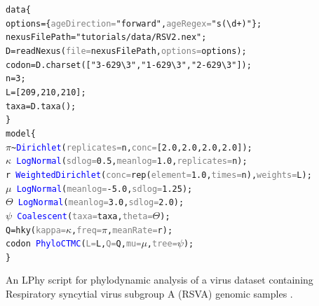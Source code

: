 \documentclass[10pt,letterpaper,table]{article}
\theoremstyle{definition}
\begin{document}
{
  \small
  \begin{example}
    \begin{alltt}
      data \{
      \quad options = \{\textcolor{gray}{ageDirection=}\textcolor{constant}{"forward"}, \textcolor{gray}{ageRegex=}\textcolor{constant}{"s(\textbackslash{}d+)"}\};
      \quad nexusFilePath = \textcolor{constant}{"tutorials/data/RSV2.nex"};
      \quad D = \textcolor{generator}{readNexus}(\textcolor{gray}{file=}nexusFilePath, \textcolor{gray}{options=}options);
      \quad codon = D.\textcolor{generator}{charset}([\textcolor{constant}{"3-629\textbackslash{}3"}, \textcolor{constant}{"1-629\textbackslash{}3"}, \textcolor{constant}{"2-629\textbackslash{}3"}]);
      \quad n = \textcolor{constant}{3};
      \quad L = [\textcolor{constant}{209}, \textcolor{constant}{210}, \textcolor{constant}{210}];
      \quad taxa = D.\textcolor{generator}{taxa}();
      \}
      model \{
      \quad \textcolor{bluishgreen}{\(\pi\)} \textasciitilde \textcolor{blue}{Dirichlet}(\textcolor{gray}{replicates=}n, \textcolor{gray}{conc=}[\textcolor{constant}{2.0}, \textcolor{constant}{2.0}, \textcolor{constant}{2.0}, \textcolor{constant}{2.0}]);
      \quad \textcolor{bluishgreen}{\(\kappa\)} ~ \textcolor{blue}{LogNormal}(\textcolor{gray}{sdlog=}\textcolor{constant}{0.5}, \textcolor{gray}{meanlog=}\textcolor{constant}{1.0}, \textcolor{gray}{replicates=}n);
      \quad \textcolor{bluishgreen}{r} ~ \textcolor{blue}{WeightedDirichlet}(\textcolor{gray}{conc=}\textcolor{generator}{rep}(\textcolor{gray}{element=}\textcolor{constant}{1.0}, \textcolor{gray}{times=}n), \textcolor{gray}{weights=}L);
      \quad \textcolor{bluishgreen}{\(\mu\)} ~ \textcolor{blue}{LogNormal}(\textcolor{gray}{meanlog=}\textcolor{constant}{-5.0}, \textcolor{gray}{sdlog=}\textcolor{constant}{1.25});
      \quad \textcolor{bluishgreen}{\(\Theta\)} ~ \textcolor{blue}{LogNormal}(\textcolor{gray}{meanlog=}\textcolor{constant}{3.0}, \textcolor{gray}{sdlog=}\textcolor{constant}{2.0});
      \quad \textcolor{bluishgreen}{\(\psi\)} ~ \textcolor{blue}{Coalescent}(\textcolor{gray}{taxa=}taxa, \textcolor{gray}{theta=}\textcolor{bluishgreen}{\(\Theta\)});
      \quad Q = \textcolor{generator}{hky}(\textcolor{gray}{kappa=}\textcolor{bluishgreen}{\(\kappa\)}, \textcolor{gray}{freq=}\textcolor{bluishgreen}{\(\pi\)}, \textcolor{gray}{meanRate=}\textcolor{bluishgreen}{r});
      \quad \textcolor{bluishgreen}{codon} ~ \textcolor{blue}{PhyloCTMC}(\textcolor{gray}{L=}L, \textcolor{gray}{Q=}Q, \textcolor{gray}{mu=}\textcolor{bluishgreen}{\(\mu\)}, \textcolor{gray}{tree=}\textcolor{bluishgreen}{\(\psi\)});
      \}
    \end{alltt}
    \caption{An LPhy script for phylodynamic analysis of a virus dataset containing Respiratory syncytial virus subgroup A (RSVA) genomic samples \cite{zlateva2004molecular, zlateva2005genetic}.
    \newline}
    \label{lphy:rsva}
  \end{example}
}
\end{document}
